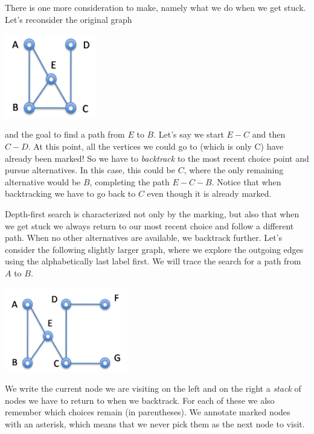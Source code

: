 There is one more consideration to make, namely what we do when we get
stuck.  Let's reconsider the original graph
\begin{center}
  \includegraphics[width=0.3\textwidth]{img/graph0.png}
\end{center}
and the goal to find a path from $E$ to $B$.  Let's say we start $E -
C$ and then $C - D$.  At this point, all the vertices we could go to
(which is only C) have already been marked!  So we have to
\emph{backtrack} to the most recent choice point and pursue
alternatives.  In this case, this could be $C$, where the only
remaining alternative would be $B$, completing the path $E - C - B$.
Notice that when backtracking we have to go back to $C$ even though it
is already marked.

Depth-first search is characterized not only by the marking, but also
that when we get stuck we always return to our most recent choice and
follow a different path.  When no other alternatives are available, we
backtrack further.  Let's consider the following slightly larger
graph, where we explore the outgoing edges using the alphabetically
last label first. We will trace the search for a path from $A$ to $B$.
\begin{center}
  \includegraphics[width=0.4\textwidth]{img/dfs3.png}
\end{center}
We write the current node we are visiting on the left and on the right
a \emph{stack} of nodes we have to return to when we backtrack.  For
each of these we also remember which choices remain (in parentheses).
We annotate marked nodes with an asterisk, which means that we never
pick them as the next node to visit.

